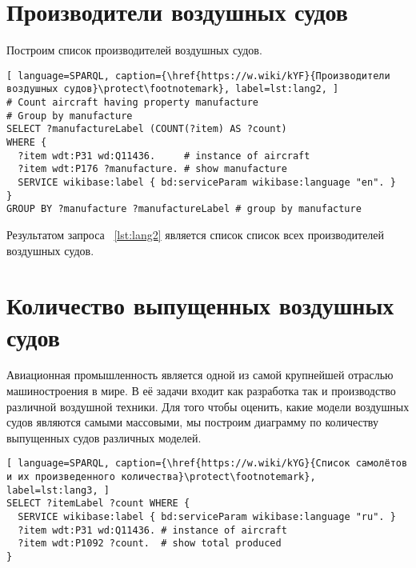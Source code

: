 \section{Производители воздушных судов}

Построим список производителей воздушных судов.

\begin{lstlisting}[ language=SPARQL, caption={\href{https://w.wiki/kYF}{Производители воздушных судов}\protect\footnotemark}, label=lst:lang2, ]
# Count aircraft having property manufacture
# Group by manufacture
SELECT ?manufactureLabel (COUNT(?item) AS ?count) 
WHERE {
  ?item wdt:P31 wd:Q11436.     # instance of aircraft
  ?item wdt:P176 ?manufacture. # show manufacture
  SERVICE wikibase:label { bd:serviceParam wikibase:language "en". }
}
GROUP BY ?manufacture ?manufactureLabel # group by manufacture
\end{lstlisting}

Результатом запроса ~\ref{lst:lang2} является список список всех производителей воздушных судов. 


\section{Количество выпущенных воздушных судов}

Авиационная промышленность является одной из самой крупнейшей отраслью машиностроения в мире. 
В её задачи входит как разработка так и производство различной воздушной техники. 
Для того чтобы оценить, какие модели воздушных судов являются самыми массовыми, 
мы построим диаграмму по количеству выпущенных судов различных моделей.

\begin{lstlisting}[ language=SPARQL, caption={\href{https://w.wiki/kYG}{Список самолётов и их произведенного количества}\protect\footnotemark}, label=lst:lang3, ]
SELECT ?itemLabel ?count WHERE {
  SERVICE wikibase:label { bd:serviceParam wikibase:language "ru". }
  ?item wdt:P31 wd:Q11436. # instance of aircraft
  ?item wdt:P1092 ?count.  # show total produced
}
\end{lstlisting}

